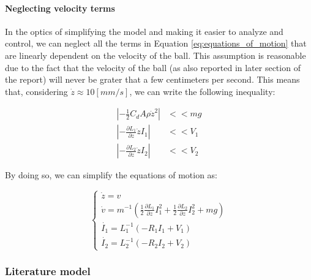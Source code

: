 \paragraph{Neglecting velocity terms}

In the optics of simplifying the model and making it easier to analyze and control, we can neglect all the terms in Equation \ref{eq:equations_of_motion} that are linearly dependent on the velocity of the ball.
This assumption is reasonable due to the fact that the velocity of the ball (as also reported in later section of the report) will never be grater that a few centimeters per second.
This means that, considering $\dot{z} \approx 10 [mm/s]$, we can write the following inequality:

\begin{equation}
    \begin{aligned}
        \left| -\frac{1}{2} C_d A \rho \dot{z}^2 \right|            & << m g \\
        \left| -\frac{\partial L_1}{\partial z} \dot{z} I_1 \right| & << V_1 \\
        \left| -\frac{\partial L_2}{\partial z} \dot{z} I_2 \right| & << V_2
    \end{aligned}
\end{equation}

By doing so, we can simplify the equations of motion as:

\begin{equation}
    \begin{cases}
        \dot{z} = v                                                                                                                                 \\
        \dot{v} = m^{-1} \left(\frac{1}{2} \frac{\partial L_1}{\partial z} I_1^2 + \frac{1}{2} \frac{\partial L_2}{\partial z} I_2^2 + m g  \right) \\
        \dot{I_1} = L_1^{-1} \left(- R_1 I_1 + V_1 \right)                                                                                          \\
        \dot{I_2} = L_2^{-1} \left(- R_2 I_2 + V_2 \right)
    \end{cases}
    \label{eq:equations_of_motion_no_velocity}
\end{equation}


\subsubsection{Literature model}
\label{subsubsec:literature_model}

